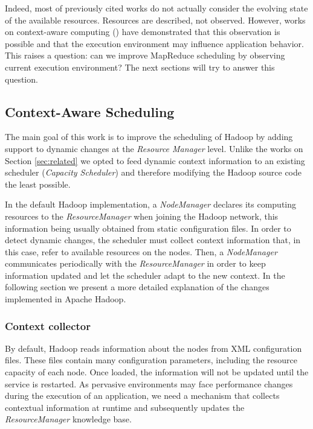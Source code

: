 Indeed, most of previously cited works do not actually consider the evolving state of the available resources. Resources are described, not observed. However, works on context-aware computing (\cite{Baldauf, Maamar, Ramakrishnan2014, Najar2015}) have demonstrated that this observation is possible and that the execution environment may influence application behavior. This raises a question: can we improve MapReduce scheduling by observing current execution environment? The next sections will try to answer this question.   

\subsection{Context-Aware Scheduling} \label{sec:desenv}
The main goal of this work is to improve the scheduling of Hadoop by adding support to dynamic changes at the \textit{Resource Manager} level. Unlike the works on Section \ref{sec:related} we opted to feed dynamic context information to an existing scheduler (\textit{Capacity Scheduler}) and therefore modifying the Hadoop source code the least possible. 

In the default Hadoop implementation, a \textit{NodeManager} declares its computing resources to the \textit{ResourceManager} when joining the Hadoop network, this information being usually obtained from static configuration files. In order to detect dynamic changes, the scheduler must collect context information that, in this case, refer to available resources on the nodes. Then, a \textit{NodeManager} communicates periodically with the \textit{ResourceManager} in order to keep information updated and let the scheduler adapt to the new context. In the following section we present a more detailed explanation of the changes implemented in Apache Hadoop.

\subsubsection*{Context collector}
By default, Hadoop reads information about the nodes from XML configuration files. These files contain many configuration parameters, including the resource capacity of each node. Once loaded, the information will not be updated until the service is restarted. As pervasive environments may face performance changes during the execution of an application, we need a mechanism that collects contextual information at runtime and subsequently updates the \textit{ResourceManager} knowledge base.

